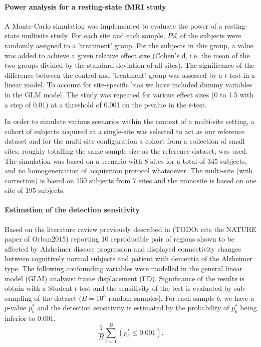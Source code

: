 \documentclass[authoryear]{elsarticle}
\begin{document}
\paragraph{Power analysis for a resting-state fMRI study}
A Monte-Carlo simulation was implemented to evaluate the power of a resting-state multisite study. For each site and each sample, $P\%$ of the subjects were randomly assigned to a 'treatment' group. For the subjects in this group, a value was added to achieve a given relative effect size (Cohen's d, i.e. the mean of the two groups divided by the standard deviation of all sites). The significance of the difference between the control and 'treatment' group was assessed by a $t$-test in a linear model. To account for site-specific bias we have included dummy variables in the GLM model. The study was repeated for various effect sizes (0 to 1.5 with a step of 0.01) at a threshold of 0.001 on the p-value in the $t$-test.

In order to simulate various scenarios within the context of a multi-site setting, a cohort of subjects acquired at a single-site was selected to act as our reference dataset and for the multi-site configuration a cohort from a collection of small sites, roughly totalling the same sample size as the reference dataset, was used. The simulation was based on a scenario with 8 sites for a total of 345 subjects, and no homogeneization of acquisition protocol whatsoever. The multi-site (with correction) is based on 150 subjects from 7 sites and the monosite is based on 
one site of 195 subjects.  


\paragraph{Estimation of the detection sensitivity}
Based on the literature review previously described in (TODO: cite the NATURE paper of Orban2015) reporting 10 reproducible pair of regions shown to be affected by Alzheimer disease progression and displayed connectivity changes between cognitively normal subjects and patient with dementia of the Alzheimer type. The following confounding variables were modelled in the general linear model (GLM) analysis: frame displacement (FD). Significance of the results is obtain with a Student $t$-test and the sensitivity of the test is evaluated by sub-sampling of the dataset ($B=10^3$ random samples). For each sample $b$, we have a $p$-value $p^{*}_b$ and the detection sensitivity is estimated by the probability of $p^{*}_b$ being inferior to $0.001$.
\begin{equation}\label{Detection power}  
    \frac{1}{B}\sum\limits_{b=1}^B\left(p^{*}_b\leq0.001\right).
\end{equation}
\end{document}

